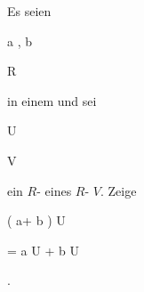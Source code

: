 {


Es seien


\mavergleichskette

{\vergleichskette

{ {\mathfrak a} , {\mathfrak b}
}

{ \subseteq }{ R
}

{  }{
}

{    }{
}

{   }{
}

}
{}{}{}
in einem
und sei


\mavergleichskette

{\vergleichskette

{U
}

{ \subseteq }{ V
}

{  }{
}

{    }{
}

{   }{
}

}
{}{}{}
ein
$R$-
eines
$R$-
$V$. Zeige


\mavergleichskettedisp

{\vergleichskette

{ \left(  {\mathfrak a}+ {\mathfrak b}  \right)  \cdot U
}

{ =} { {\mathfrak a} \cdot U  + {\mathfrak b} \cdot U
}

{ } {
}

{ } {
}

{ } {
}

}
{}{}{.}


}

{} {}



{}

